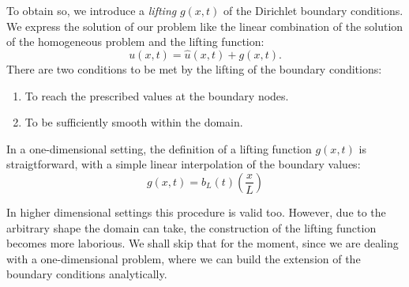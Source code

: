 \documentclass[../main.tex]{subfiles}
\begin{document}
To obtain so, we introduce a \emph{lifting} $g(x,t)$ of the Dirichlet boundary conditions.
We express the solution of our problem like the linear combination of the solution of the homogeneous problem and the lifting function:
\begin{equation}
    \label{eq:1d_fom_homogeneous_plus_lifting}
    u(x,t) = \hat{u}(x,t) + g(x,t).
\end{equation}
There are two conditions to be met by the lifting of the boundary conditions:
\begin{enumerate}
    \item To reach the prescribed values at the boundary nodes.
    \item To be sufficiently smooth within the domain.
\end{enumerate}
In a one-dimensional setting, the definition of a lifting function $g(x,t)$ is straigtforward, with a simple linear interpolation of the boundary values:
\begin{equation}
    \label{eq:1d_fom_dirichlet_lifting}
    g(x,t) = b_L(t) \left(\frac{x}{L}\right)
\end{equation}

In higher dimensional settings this procedure is valid too. 
However, due to the arbitrary shape the domain can take, the construction of the lifting function becomes more laborious.
We shall skip that for the moment, since we are dealing with a one-dimensional problem, where we can build the extension of the boundary conditions analytically. 
\end{document}
